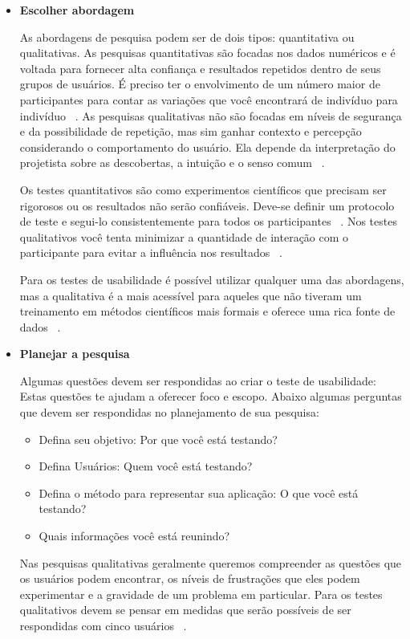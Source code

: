 \begin{itemize}

\item \textbf{Escolher abordagem}

As abordagens de pesquisa podem ser de dois tipos: quantitativa ou qualitativas. 
%
As pesquisas quantitativas são focadas nos dados numéricos e é voltada para fornecer alta confiança e resultados repetidos dentro de seus grupos de usuários. É preciso ter o envolvimento de um número maior de participantes para contar as variações que você encontrará de indivíduo para indivíduo ~\cite{unger2009}.
%
As pesquisas qualitativas não são focadas em níveis de segurança e da possibilidade de repetição, mas sim ganhar contexto e percepção considerando o comportamento do usuário. Ela depende da interpretação do projetista sobre as descobertas, a intuição e o senso comum ~\cite{unger2009}.

Os testes quantitativos são como experimentos científicos que precisam ser rigorosos ou os resultados não serão confiáveis. Deve-se definir um protocolo de teste e segui-lo consistentemente para todos os participantes ~\cite{krug2010}.
%
Nos testes qualitativos você tenta minimizar a quantidade de interação com o participante para evitar a influência nos resultados ~\cite{krug2010}.

	Para os testes de usabilidade é possível utilizar qualquer uma das abordagens, mas a qualitativa é a mais acessível para aqueles que não tiveram um treinamento em métodos científicos mais formais e oferece uma rica fonte de dados ~\cite{unger2009}.


\item \textbf{Planejar a pesquisa}

Algumas questões devem ser respondidas ao criar o teste de usabilidade: Estas questões te ajudam a oferecer foco e escopo. Abaixo algumas perguntas que devem ser respondidas no planejamento de sua pesquisa:

\begin{itemize}
\item Defina seu objetivo: Por que você está testando? %
\item Defina Usuários: Quem você está testando? %
\item Defina o método para representar sua aplicação: O que você está testando?
\item Quais informações você está reunindo? 
\end{itemize}

Nas pesquisas qualitativas geralmente queremos compreender as questões que os usuários podem encontrar, os níveis de frustrações que eles podem experimentar e a gravidade de um problema em particular. Para os testes qualitativos devem se pensar em medidas que serão possíveis de ser respondidas com cinco usuários ~\cite{unger2009}. 


\end{itemize}
